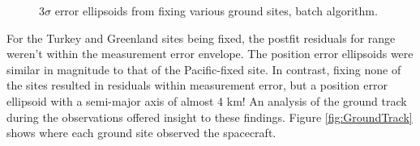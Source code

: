 \documentclass[]{aiaa-tc}%
\begin{document}
	\begin{figure}[H]
		\centering
		\caption{3$\sigma$ error ellipsoids from fixing various ground sites, batch algorithm. }
		\label{fig:ErrorEllipsoids_GS}
	\end{figure}	

	For the Turkey and Greenland sites being fixed, the postfit residuals for range weren't within the measurement error envelope. The position error ellipsoids were similar in magnitude to that of the Pacific-fixed site.  In contrast, fixing none of the sites resulted in residuals within measurement error, but a position error ellipsoid with a semi-major axis of almost 4 km!  An analysis of the ground track during the observations offered insight to these findings.  Figure \ref{fig:GroundTrack} shows where each ground site observed the spacecraft.
\end{document}
